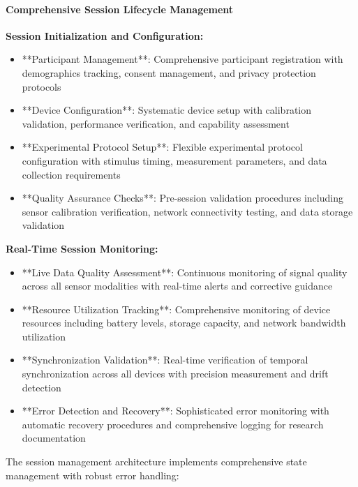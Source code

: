 \documentclass[12pt,a4paper]{report}
\begin{document}
\paragraph{Comprehensive Session Lifecycle Management}

\textbf{Session Initialization and Configuration:}

\begin{itemize}
\item **Participant Management**: Comprehensive participant registration with demographics tracking, consent management, and
  privacy protection protocols
\item **Device Configuration**: Systematic device setup with calibration validation, performance verification, and
  capability assessment
\item **Experimental Protocol Setup**: Flexible experimental protocol configuration with stimulus timing, measurement
  parameters, and data collection requirements
\item **Quality Assurance Checks**: Pre-session validation procedures including sensor calibration verification, network
  connectivity testing, and data storage validation

\end{itemize}
\textbf{Real-Time Session Monitoring:}

\begin{itemize}
\item **Live Data Quality Assessment**: Continuous monitoring of signal quality across all sensor modalities with real-time
  alerts and corrective guidance
\item **Resource Utilization Tracking**: Comprehensive monitoring of device resources including battery levels, storage
  capacity, and network bandwidth utilization
\item **Synchronization Validation**: Real-time verification of temporal synchronization across all devices with precision
  measurement and drift detection
\item **Error Detection and Recovery**: Sophisticated error monitoring with automatic recovery procedures and comprehensive
  logging for research documentation

\end{itemize}
The session management architecture implements comprehensive state management with robust error handling:
\end{document}
